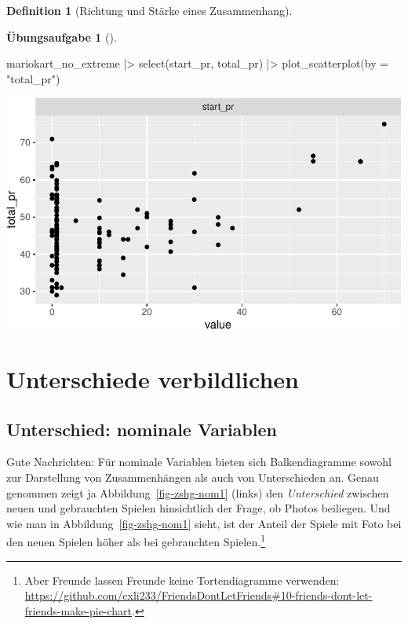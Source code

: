 \documentclass[
  a4paper,
  DIV=11]{scrreprt}
\newenvironment{Shaded}{\begin{snugshade}}{\end{snugshade}}
\newcommand{\AttributeTok}[1]{\textcolor[rgb]{0.40,0.45,0.13}{#1}}
\newcommand{\FunctionTok}[1]{\textcolor[rgb]{0.28,0.35,0.67}{#1}}
\newcommand{\NormalTok}[1]{\textcolor[rgb]{0.00,0.23,0.31}{#1}}
\newcommand{\SpecialCharTok}[1]{\textcolor[rgb]{0.37,0.37,0.37}{#1}}
\newcommand{\StringTok}[1]{\textcolor[rgb]{0.13,0.47,0.30}{#1}}
\theoremstyle{definition}
\newtheorem{exercise}{Übungsaufgabe}[chapter]
\theoremstyle{definition}
\theoremstyle{definition}
\newtheorem{definition}{Definition}[chapter]
\theoremstyle{remark}
\begin{document}
\begin{definition}[Richtung und Stärke eines
Zusammenhang]
\begin{exercise}[]
\begin{Shaded}
\begin{Highlighting}[]
\NormalTok{mariokart\_no\_extreme }\SpecialCharTok{|\textgreater{}} 
  \FunctionTok{select}\NormalTok{(start\_pr, total\_pr) }\SpecialCharTok{|\textgreater{}} 
  \FunctionTok{plot\_scatterplot}\NormalTok{(}\AttributeTok{by =} \StringTok{"total\_pr"}\NormalTok{)}
\end{Highlighting}
\end{Shaded}

\includegraphics{040-verbildlichen_files/figure-pdf/unnamed-chunk-34-1.pdf}

\end{exercise}

\section{Unterschiede verbildlichen}\label{unterschiede-verbildlichen}

\subsection{Unterschied: nominale
Variablen}\label{unterschied-nominale-variablen}

Gute Nachrichten: Für nominale Variablen bieten sich Balkendiagramme
sowohl zur Darstellung von Zusammenhängen als auch von Unterschieden an.
Genau genommen zeigt ja Abbildung~\ref{fig-zshg-nom1} (links) den
\emph{Unterschied} zwischen neuen und gebrauchten Spielen hinsichtlich
der Frage, ob Photos beiliegen. Und wie man in
Abbildung~\ref{fig-zshg-nom1} sieht, ist der Anteil der Spiele mit Foto
bei den neuen Spielen höher als bei gebrauchten Spielen.\footnote{Aber
  Freunde lassen Freunde keine Tortendiagramme verwenden:
  \url{https://github.com/cxli233/FriendsDontLetFriends\#10-friends-dont-let-friends-make-pie-chart}.}


\end{definition}
\end{document}
